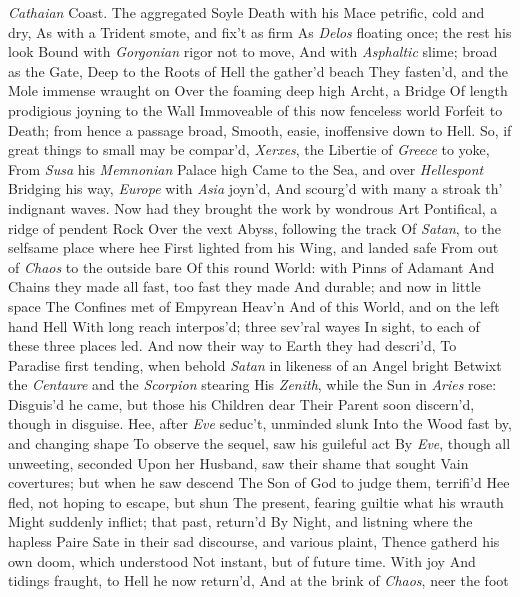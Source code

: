 \documentclass[11pt]{book}
\newcounter {first}
\begin{document}
\textit{Cathaian} Coast.  The aggregated Soyle 
Death with his Mace petrific, cold and dry, 
As with a Trident smote, and fix't as firm 
As \textit{Delos} floating once; the rest his look 
Bound with \textit{Gorgonian} rigor not to move, 
And with \textit{Asphaltic} slime; broad as the Gate, 
Deep to the Roots of Hell the gather'd beach 
They fasten'd, and the Mole immense wraught on 
Over the foaming deep high Archt, a Bridge 
Of length prodigious joyning to the Wall 
Immoveable of this now fenceless world 
Forfeit to Death; from hence a passage broad, 
Smooth, easie, inoffensive down to Hell. 
So, if great things to small may be compar'd, 
\textit{Xerxes}, the Libertie of \textit{Greece} to yoke, 
From \textit{Susa} his \textit{Memnonian} Palace high 
Came to the Sea, and over \textit{Hellespont} 
Bridging his way, \textit{Europe} with \textit{Asia} joyn'd, 
And scourg'd with many a stroak th' indignant waves. 
Now had they brought the work by wondrous Art 
Pontifical, a ridge of pendent Rock 
Over the vext Abyss, following the track 
Of \textit{Satan}, to the selfsame place where hee 
First lighted from his Wing, and landed safe 
From out of \textit{Chaos} to the outside bare 
Of this round World: with Pinns of Adamant 
And Chains they made all fast, too fast they made 
And durable; and now in little space 
The Confines met of Empyrean Heav'n 
And of this World, and on the left hand Hell 
With long reach interpos'd; three sev'ral wayes 
In sight, to each of these three places led. 
And now their way to Earth they had descri'd, 
To Paradise first tending, when behold 
\textit{Satan} in likeness of an Angel bright 
Betwixt the \textit{Centaure} and the \textit{Scorpion} stearing 
His \textit{Zenith}, while the Sun in \textit{Aries} rose: 
Disguis'd he came, but those his Children dear 
Their Parent soon discern'd, though in disguise. 
Hee, after \textit{Eve} seduc't, unminded slunk 
Into the Wood fast by, and changing shape 
To observe the sequel, saw his guileful act 
By \textit{Eve}, though all unweeting, seconded 
Upon her Husband, saw their shame that sought 
Vain covertures; but when he saw descend 
The Son of God to judge them, terrifi'd 
Hee fled, not hoping to escape, but shun 
The present, fearing guiltie what his wrauth 
Might suddenly inflict; that past, return'd 
By Night, and listning where the hapless Paire 
Sate in their sad discourse, and various plaint, 
Thence gatherd his own doom, which understood 
Not instant, but of future time.  With joy 
And tidings fraught, to Hell he now return'd, 
And at the brink of \textit{Chaos}, neer the foot 
\end{document}
